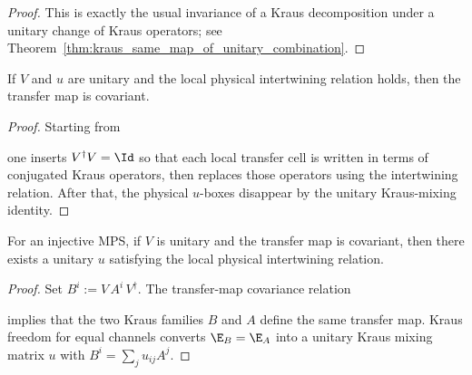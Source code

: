 \begin{proof}
    \leanok
    This is exactly the usual invariance of a Kraus decomposition under a
    unitary change of Kraus operators; see Theorem~\ref{thm:kraus_same_map_of_unitary_combination}.
\end{proof}

\begin{theorem}%
    \label{thm:condC1_imp_condC2}
    \leanok
    If $V$ and $u$ are unitary and the local physical intertwining
    relation holds, then the transfer map is covariant.
\end{theorem}

\begin{proof}
    \leanok
    Starting from
    \begin{center}
    \end{center}
    one inserts $V^\dagger V = \Id$ so that each local transfer cell is
    written in terms of conjugated Kraus operators, then replaces those
    operators using the intertwining relation. After that, the physical
    $u$-boxes disappear by the unitary Kraus-mixing identity.
\end{proof}

\begin{theorem}%
    \label{thm:condC2_imp_condC1_of_injective}
    \leanok
    For an injective MPS, if $V$ is unitary and the transfer map is
    covariant, then there exists a unitary $u$ satisfying the local
    physical intertwining relation.
\end{theorem}

\begin{proof}
    \leanok
    Set $B^i := V\, A^i\, V^\dagger$. The transfer-map covariance relation
    \begin{center}
    \end{center}
    implies that the two Kraus families $B$ and $A$ define the same
    transfer map. Kraus freedom for equal channels converts
    $\E_B = \E_A$ into a unitary Kraus mixing matrix $u$ with
    $B^i = \sum_j u_{ij} A^j$.
\end{proof}

